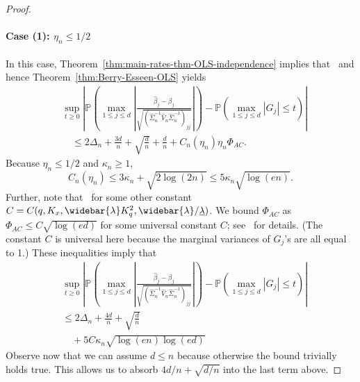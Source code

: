 \documentclass{article}
\begin{document}
\begin{appendices}
\begin{proof}
\paragraph{Case (1): $\eta_n \le 1/2$} In this case, Theorem~\ref{thm:main-rates-thm-OLS-independence} implies that
\ and hence Theorem~\ref{thm:Berry-Esseen-OLS} yields
\begin{align*}
&\sup_{t\ge 0}\left|\mathbb{P}\left(\max_{1\le j\le d}\left|\frac{\widehat{\beta}_j - \beta_j}{\sqrt{(\widehat{\Sigma}_n^{-1}\widehat{V}_n\widehat{\Sigma}_n^{-1})_{jj}}}\right|\right) - \mathbb{P}\left(\max_{1\le j\le d}|G_j| \le t\right)\right|\\ &\quad\le 2\Delta_n + \frac{3d}{n} + \sqrt{\frac{d}{n}} + \frac{d}{n} + C_n(\eta_n)\eta_n\Phi_{AC}.
\end{align*}
Because $\eta_n \le 1/2$ and $\kappa_n \ge1$,
$$
C_n(\eta_n) \le 3\kappa_n + \sqrt{2\log(2n)} \le 5\kappa_n\sqrt{\log(en)}.
$$
Further, note that
\,
\]
for some other constant $C = C(q, K_x, \widebar{\lambda}K_q^2, \widebar{\lambda}/\underline{\lambda})$. We bound $\Phi_{AC}$ as $\Phi_{AC} \le C\sqrt{\log(ed)}$ for some universal constant $C$; see~\cite{Chern15,chernozhukov2017detailed} for details. (The constant $C$ is universal here because the marginal variances of $G_j$'s are all equal to 1.)
These inequalities imply that
\begin{align*}
&\sup_{t\ge 0}\left|\mathbb{P}\left(\max_{1\le j\le d}\left|\frac{\widehat{\beta}_j - \beta_j}{\sqrt{(\widehat{\Sigma}_n^{-1}\widehat{V}_n\widehat{\Sigma}_n^{-1})_{jj}}}\right|\right) - \mathbb{P}\left(\max_{1\le j\le d}|G_j| \le t\right)\right|\\ &\le 2\Delta_n + \frac{4d}{n} + \sqrt{\frac{d}{n}}\\ &\quad+ 5C\kappa_n\sqrt{\log(en)\log(ed)}\left.
\end{align*}
Observe now that we can assume $d \le n$ because otherwise the bound trivially holds true. This allows us to absorb $4d/n + \sqrt{d/n}$ into the last term above.

\end{proof}
\end{appendices}
\end{document}
